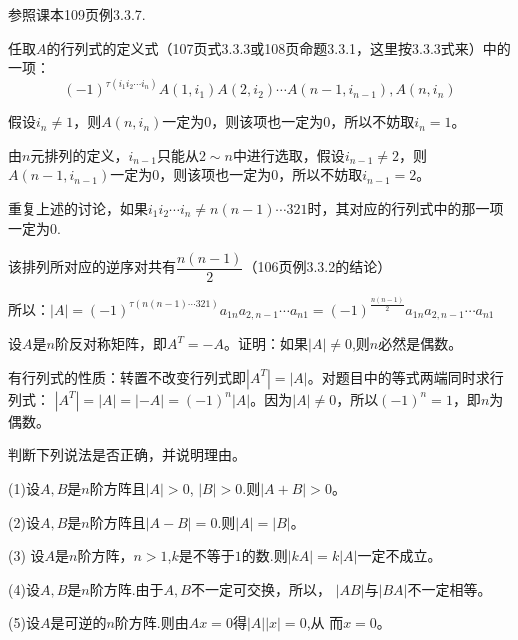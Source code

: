 \documentclass[a4paper]{report}
\begin{document}
\begin{jie}
参照课本109页例3.3.7.

任取$A$的行列式的定义式（107页式3.3.3或108页命题3.3.1，这里按3.3.3式来）中的一项：
\begin{equation*}
(-1)^{\tau(i_1i_2\cdots i_{n})}A(1,i_1)A(2,i_2)\cdots A(n-1,i_{n-1}),A(n,i_n)
\end{equation*}

假设$i_n\neq 1$，则$A(n,i_n)$一定为0，则该项也一定为0，所以不妨取$i_n=1$。

由$n$元排列的定义，$i_{n-1}$只能从$2\sim n$中进行选取，假设$i_{n-1}\neq 2$，则$A(n-1,i_{n-1})$一定为0，则该项也一定为0，所以不妨取$i_{n-1}=2$。

重复上述的讨论，如果$i_1i_2\cdots i_n\neq n(n-1)\cdots 321$时，其对应的行列式中的那一项一定为0.

该排列所对应的逆序对共有$
\dfrac{n(n-1)}{2}
$（106页例3.3.2的结论）

所以：$|A|=(-1)^{\tau(n(n-1)\cdots321)}a_{1n}a_{2,n-1}\cdots a_{n1}=(-1)^{\frac{n(n-1)}{2}}a_{1n}a_{2,n-1}\cdots a_{n1}$
\end{jie}

\EX 设$A$是$n$阶反对称矩阵，即$A^T=-A$。证明：如果$|A|\neq 0$,则$n$必然是偶数。

\begin{zhengming}
有行列式的性质：转置不改变行列式即$|A^T|=|A|$。对题目中的等式两端同时求行列式：
$|A^T|=|A|=|-A|=(-1)^n|A|$。因为$|A|\neq 0$，所以$(-1)^n=1$，即$n$为偶数。
\end{zhengming}

\EX 判断下列说法是否正确，并说明理由。

(1)设$A,B$是$n$阶方阵且$|A|>0$, $|B|>0$.则$|A+B|>0$。

(2)设$A,B$是$n$阶方阵且$|A-B|=0$.则$|A|=|B|$。

(3) 设$A$是$n$阶方阵，$n>1$,$k$是不等于$1$的数.则$|kA|=
k|A|$一定不成立。

(4)设$A,B$是$n$阶方阵.由于$A,B$不一定可交换，所以，
$|AB|$与$|BA|$不一定相等。

(5)设$A$是可逆的$n$阶方阵.则由$Ax=0$得$|A||x|=0$,从
而$x=0$。
\end{document}
